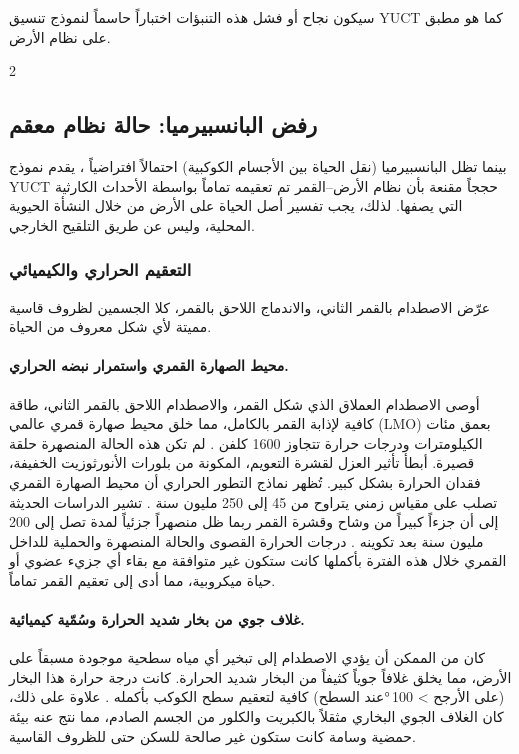 \documentclass[11pt,a4paper]{article}
\begin{document}
	سيكون نجاح أو فشل هذه التنبؤات اختباراً حاسماً لنموذج تنسيق YUCT كما هو مطبق على نظام الأرض.
	
	\begin{multicols}{2}
		
		\subsection{رفض البانسبيرميا: حالة نظام معقم}
		بينما تظل البانسبيرميا (نقل الحياة بين الأجسام الكوكبية) احتمالاً افتراضياً \cite{PanspermiaReview}، يقدم نموذج YUCT حججاً مقنعة بأن نظام الأرض–القمر تم تعقيمه تماماً بواسطة الأحداث الكارثية التي يصفها. لذلك، يجب تفسير أصل الحياة على الأرض من خلال النشأة الحيوية المحلية، وليس عن طريق التلقيح الخارجي.
		
		\subsubsection{التعقيم الحراري والكيميائي}
		عرّض الاصطدام بالقمر الثاني، والاندماج اللاحق بالقمر، كلا الجسمين لظروف قاسية مميتة لأي شكل معروف من الحياة.
		
		\paragraph{محيط الصهارة القمري واستمرار نبضه الحراري.}
		أوصى الاصطدام العملاق الذي شكل القمر، والاصطدام اللاحق بالقمر الثاني، طاقة كافية لإذابة القمر بالكامل، مما خلق محيط صهارة قمري عالمي (LMO) بعمق مئات الكيلومترات ودرجات حرارة تتجاوز 1600 كلفن \cite{Sahijpal2020}. لم تكن هذه الحالة المنصهرة حلقة قصيرة. أبطأ تأثير العزل لقشرة التعويم، المكونة من بلورات الأنورثوزيت الخفيفة، فقدان الحرارة بشكل كبير. تُظهر نماذج التطور الحراري أن محيط الصهارة القمري تصلب على مقياس زمني يتراوح من 45 إلى 250 مليون سنة \cite{Colin2024, Maurice2018}. تشير الدراسات الحديثة إلى أن جزءاً كبيراً من وشاح وقشرة القمر ربما ظل منصهراً جزئياً لمدة تصل إلى 200 مليون سنة بعد تكوينه \cite{Maurice2020}. درجات الحرارة القصوى والحالة المنصهرة والحملية للداخل القمري خلال هذه الفترة بأكملها كانت ستكون غير متوافقة مع بقاء أي جزيء عضوي أو حياة ميكروبية، مما أدى إلى تعقيم القمر تماماً.
		
		\paragraph{غلاف جوي من بخار شديد الحرارة وسُمّية كيميائية.}
		كان من الممكن أن يؤدي الاصطدام إلى تبخير أي مياه سطحية موجودة مسبقاً على الأرض، مما يخلق غلافاً جوياً كثيفاً من البخار شديد الحرارة. كانت درجة حرارة هذا البخار (على الأرجح > 100 °عند السطح) كافية لتعقيم سطح الكوكب بأكمله \cite{Zahnle2015}. علاوة على ذلك، كان الغلاف الجوي البخاري مثقلاً بالكبريت والكلور من الجسم الصادم، مما نتج عنه بيئة حمضية وسامة كانت ستكون غير صالحة للسكن حتى للظروف القاسية.
		

\end{multicols}
\end{document}
